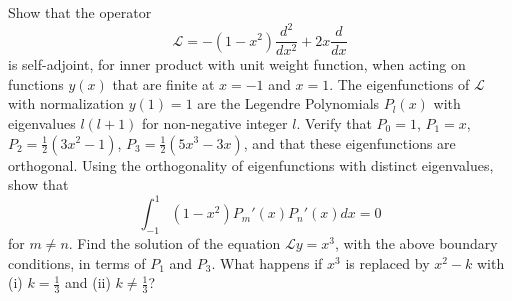 \documentclass[a4paper]{article}
\begin{document}
\newpage
\begin{qns}
Show that the operator
$$\mathcal{L}=-(1-x^2)\frac{d^2}{dx^2}+2x\frac{d}{dx}$$
is self-adjoint, for inner product with unit weight function, when acting on functions $y(x)$ that are finite at $x=-1$ and $x=1$. The eigenfunctions of $\mathcal{L}$ with normalization $y(1)=1$ are the Legendre Polynomials $P_l(x)$ with eigenvalues $l(l+1)$ for non-negative integer $l$. Verify that $P_0=1$, $P_1=x$, $P_2=\frac{1}{2}(3x^2-1)$, $P_3=\frac{1}{2}(5x^3-3x)$, and that these eigenfunctions are orthogonal. Using the orthogonality of eigenfunctions with distinct eigenvalues, show that
$$\int_{-1}^1(1-x^2)P_m'(x)P_n'(x)dx=0$$
for $m\neq n$. Find the solution of the equation $\mathcal{L}y=x^3$, with the above boundary conditions, in terms of $P_1$ and $P_3$. What happens if $x^3$ is replaced by $x^2-k$ with (i) $k=\frac{1}{3}$ and (ii) $k\neq\frac{1}{3}$?
\end{qns}
\end{document}
